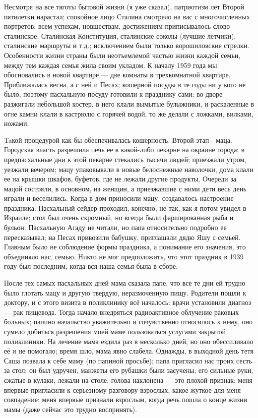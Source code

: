 \label{178-1}
Несмотря на все тяготы бытовой жизни (я уже сказал), патриотизм лет Второй пятилетки нарастал; спокойное лицо Сталина смотрело на вас с многочисленных портретов; всем успехам, новшествам, достижениям приписывалось слово сталинское: Сталинская Конституция, сталинские соколы (лучшие летчики), сталинские маршруты и т.д.; исключением были только ворошиловские стрелки. Особенности жизни страны были неотъемлемой частью жизни каждой семьи, между тем каждая семья жила своим укладом. К началу 1959 года мы обосновались в новой квартире — две комнаты в трехкомнатной квартире. Приближалась весна, а с ней и Песах; кошерной посуды в те годы ни у кого не было, поэтому пасхальную посуду готовили к празднику сами: во дворе разжигали небольшой костер, в него клали вымытые булыжники, и раскаленные в огне камни клали в кастрюлю с горячей водой, то же делали с ложками, вилками, ножами.

\label{179-1}
Taкой процедурой как бы обеспечивалась кошерность. Второй этап - маца. Городская власть разрешила печь ее в какой-либо пекарне на окраине города; в предпасхальные дни к этой пекарне стекались тысячи людей; приезжали утром, уезжали вечером; мацу упаковывали в новые белоснежные наволочки, дома клали ее на крышки шкафов, буфетов, где не лежали другие продукты. Очереди за мацой состояли, в основном, из женщин, а приезжавшие с ними дети весь день играли и веселились. Когда в дом приносили мацу, создавалось настроение праздника. Пасхальный сейдер проходил, конечно, не так, как я потом увидел в Израиле; стол был очень скромный, но всегда были фаршированная рыба и бульон. Пасхальную Агаду не читали, но папа относительно подробно ее пересказывал; на Песах привозили бабушку, приглашали дядю Яшу с семьей. Главным было не соблюдение формы праздника, а понимание его значения, это объединяло нас, семью. Никто не мог предположить, что этот праздник в 1939 году был последним, когда вся наша семья была в сборе.

\label{180-1}
После тех самых пасхальных дней мама сказала папе, что все те дни ей трудно было глотать мацу и другую твердую,
неразмоченную пищу. Родители пошли к доктору, и с этого визита в поликлинику всё началось: врачи установили диагноз — рак пищевода. Тогда начало внедряться радиоактивное облучение раковых больных; папино начальство уважительно и сочувственно относилось к нему, оно сумело добиться разрешения моей маме пользоваться услугами закрытой поликлиники. На лечение мама ездила раз в несколько дней, но оно обессиливало её и не помогало; время шло, мама явно слабела. Однажды, в выходной день тетя Саша позвала к себе маму (по папиной просьбе); папа пригласил нас троих сесть за стол; он был удручен, манжеты его рубашки были засучены, его сильные руки, сжатые в кулаки, лежали на столе, голова наклонена — это плохой признак; меня впервые пригласили к серьезному разговору взрослых, какое жуткое для меня совпадение: меня впервые признали взрослым, когда речь пошла о конце жизни мамы (даже сейчас это трудно воспринять).

